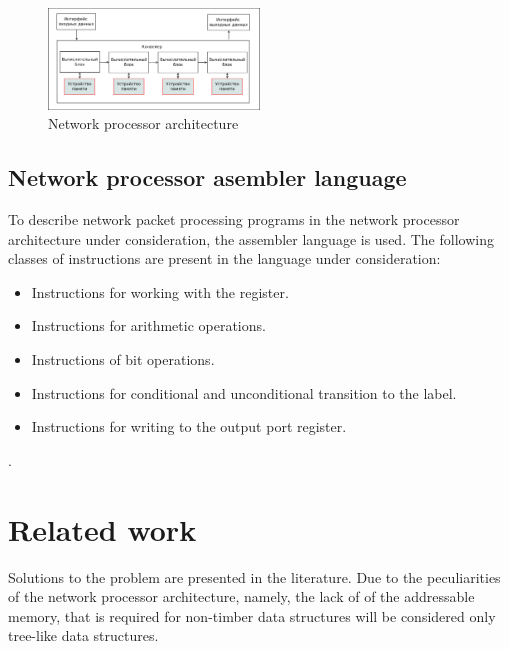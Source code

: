 \documentclass[conference]{IEEEtran}
\begin{document}
        \begin{figure}[h]
            \includegraphics[width=0.5\textwidth]{npu_all.png}
            \caption{Network processor architecture}
        \end{figure}
        
        \subsection{Network processor asembler language}
            To describe network packet processing programs in the network processor architecture 
            under consideration, the assembler language is used. 
            The following classes of instructions are present in the language under consideration:
            \begin{itemize}
                \item Instructions for working with the register.
                \item Instructions for arithmetic operations.
                \item Instructions of bit operations.
                \item Instructions for conditional and unconditional transition to the label.
                \item Instructions for writing to the output port register.
            \end{itemize}.

    \section{Related work}
        Solutions to the problem are presented in the literature. 
        Due to the peculiarities of the network processor architecture, namely, the lack of 
        of the addressable memory, 
        that is required for non-timber data structures will be considered 
        only tree-like data structures. 
        
\end{document}
